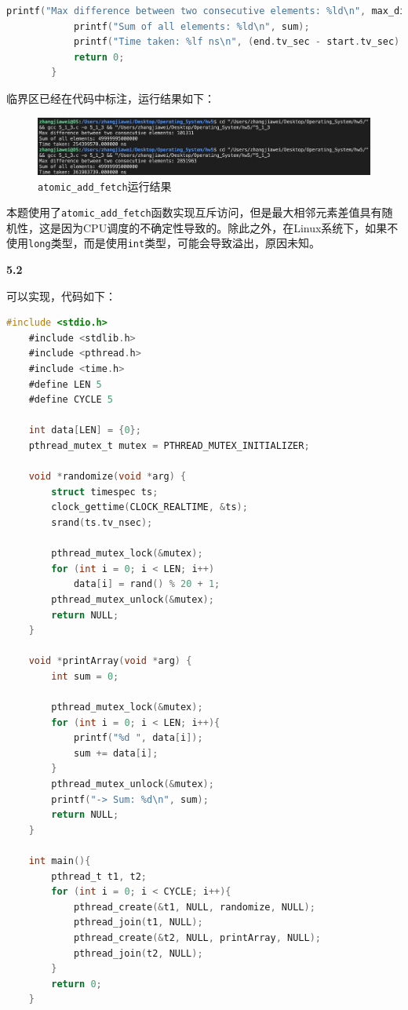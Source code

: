 \documentclass[UTF8]{report}
\newcommand{\tbf}[1]{\textbf{#1}}
\begin{document}
\begin{enumerate}[label=(\arabic*)]
\begin{lstlisting}[language=C]
            printf("Max difference between two consecutive elements: %ld\n", max_diff);
            printf("Sum of all elements: %ld\n", sum);
            printf("Time taken: %lf ns\n", (end.tv_sec - start.tv_sec) * 1e9 + (end.tv_nsec - start.tv_nsec));
            return 0;
        }
    \end{lstlisting}

    临界区已经在代码中标注，运行结果如下：

    \begin{figure}[H]
      \centering
      \includegraphics[width=\textwidth]{5_1_3.png}
      \caption{\texttt{atomic\_add\_fetch}运行结果}
    \end{figure}

    本题使用了\texttt{atomic\_add\_fetch}函数实现互斥访问，但是最大相邻元素差值具有随机性，这是因为CPU调度的不确定性导致的。除此之外，在Linux系统下，如果不使用\texttt{long}类型，而是使用\texttt{int}类型，可能会导致溢出，原因未知。
\end{enumerate}

\noindent
\tbf{5.2}

可以实现，代码如下：

\begin{lstlisting}[language=C]
    #include <stdio.h>
    #include <stdlib.h>
    #include <pthread.h>
    #include <time.h>
    #define LEN 5
    #define CYCLE 5
    
    int data[LEN] = {0};
    pthread_mutex_t mutex = PTHREAD_MUTEX_INITIALIZER;
    
    void *randomize(void *arg) {
        struct timespec ts;
        clock_gettime(CLOCK_REALTIME, &ts);
        srand(ts.tv_nsec);
    
        pthread_mutex_lock(&mutex);
        for (int i = 0; i < LEN; i++)
            data[i] = rand() % 20 + 1;
        pthread_mutex_unlock(&mutex);
        return NULL;
    }
    
    void *printArray(void *arg) {
        int sum = 0;
    
        pthread_mutex_lock(&mutex);
        for (int i = 0; i < LEN; i++){
            printf("%d ", data[i]);
            sum += data[i];
        }
        pthread_mutex_unlock(&mutex);
        printf("-> Sum: %d\n", sum);
        return NULL;
    }
    
    int main(){
        pthread_t t1, t2;
        for (int i = 0; i < CYCLE; i++){
            pthread_create(&t1, NULL, randomize, NULL);
            pthread_join(t1, NULL);
            pthread_create(&t2, NULL, printArray, NULL);
            pthread_join(t2, NULL);
        }
        return 0;
    }
\end{lstlisting}
\end{document}
